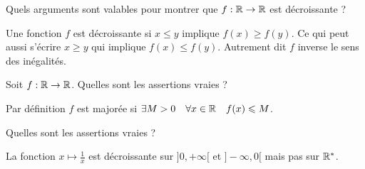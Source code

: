 \begin{question}

Quels arguments sont valables pour montrer que $f : \mathbb{R} \to \mathbb{R}$ est décroissante ?
\begin{answers}



\end{answers}
\begin{explanations}
Une fonction $f$ est décroissante si $x \le y$ implique $f(x) \ge f(y)$.
Ce qui peut aussi s'écrire $x \ge y$ qui implique $f(x) \le f(y)$. 
Autrement dit $f$ inverse le sens des inégalités.
\end{explanations}
\end{question}


\begin{question}

Soit $f : \mathbb{R} \to \mathbb{R}$. Quelles sont les assertions vraies ?
\begin{answers}

    
    
  
\end{answers}
\begin{explanations}
Par définition $f$ est majorée si $\exists  M > 0 \quad \forall x \in \mathbb{R} \quad f(x) \leqslant M$.
\end{explanations}
\end{question}


\begin{question}

Quelles sont les assertions vraies ?
\begin{answers}


    \good{Si $f : \Rr \to ]0,+\infty[$ est croissante, alors $1/f$ est décroissante.}

\end{answers}
\begin{explanations}
La fonction $x \mapsto \frac{1}{x}$ est décroissante sur $]0,+\infty[$ et $]-\infty,0[$ mais pas sur $\mathbb{R}^*$.
\end{explanations}
\end{question}


